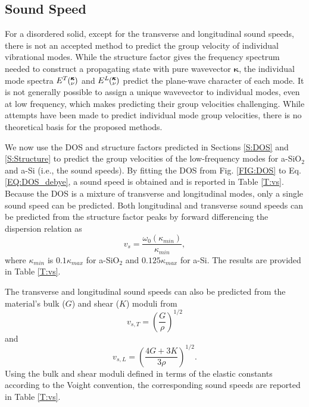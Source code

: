 \documentclass[aps,prb,onecolumn,preprint,superscriptaddress,footinbib,amsmath,amssymb,floatfix]{revtex4}
\newcommand{\kv}{\mspace{-4.0mu}\left(\mspace{-8.0mu}
\begin{smallmatrix}&\pmb{\kappa} \\&\nu\end{smallmatrix}
\mspace{-3.0mu}\right)}
\begin{document}
\subsection{\label{S:Vg}Sound Speed}

For a disordered solid,
except for the transverse and longitudinal sound speeds, there is not an
accepted method to predict the group velocity of individual 
vibrational modes.
While the structure factor gives the frequency spectrum needed to
construct a propagating state with pure wavevector $\pmb{\kappa}$,
the individual mode spectra $E^{T}\kv$ and $E^{L}\kv$ predict the
plane-wave character of each mode.
\cite{biswas_vibrational_1988,allen_diffusons_1999}
It is not generally possible
to assign a unique wavevector to individual modes, even at low frequency,
\cite{biswas_vibrational_1988,allen_diffusons_1999}
which makes predicting their group velocities challenging.
While attempts have been made to predict individual mode group velocities,
\cite{duda_reducing_2011,donadio_atomistic_2009,
he_heat_2011,he_thermal_2011,he_morphology_2011,hori_phonon_2013}
there is no theoretical basis for the proposed methods.

We now use the DOS and structure factors predicted in
Sections \ref{S:DOS} and \ref{S:Structure} to
predict the group velocities of the low-frequency modes for
a-SiO$_2$ and a-Si (i.e., the sound speeds). By fitting the DOS
from Fig. \ref{FIG:DOS} to Eq. \eqref{EQ:DOS_debye}, 
a sound speed is obtained and is 
reported in Table \ref{T:vs}. Because the DOS is a mixture of
transverse and longitudinal modes, only a single sound speed can be
predicted. 
Both longitudinal and transverse sound speeds can be predicted from
the structure factor peaks by forward differencing the dispersion relation as
\begin{equation}\label{EQ:vs_dwdk}
v_{s} = \frac{\omega_0(\kappa_{min})}{\kappa_{min}},
\end{equation}
where $\kappa_{min}$ is $0.1\kappa_{max}$ for a-SiO$_2$ and 
$0.125\kappa_{max}$ for a-Si. The results are provided in 
Table \ref{T:vs}.

The transverse and longitudinal sound speeds can
also be predicted from the material's bulk ($G$) and
shear ($K$) moduli from\cite{gale_general_2003} 
\begin{equation}\label{EQ:vs_T_elas}
v_{s,T} = \left(\frac{G}{\rho}\right)^{1/2}
\end{equation}
and
\begin{equation}\label{EQ:vs_L_elas}
v_{s,L} = \left(\frac{4G + 3K}{3\rho}\right)^{1/2}.
\end{equation}
Using the bulk and shear moduli defined in terms of the elastic
constants according to the Voight convention,\cite{gale_general_2003} 
the corresponding sound speeds are reported in Table \ref{T:vs}.
 
\end{document}
